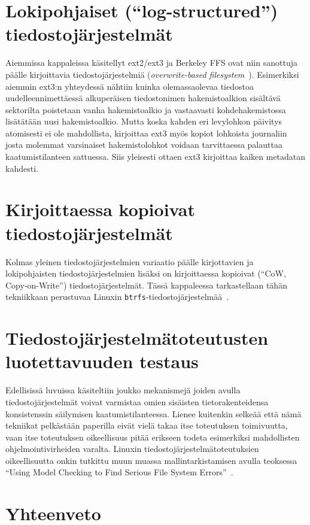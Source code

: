 \section{Lokipohjaiset (``log-structured'') tiedostojärjestelmät}
\label{ChapLogStructured}
Aiemmissa kappaleissa käsitellyt ext2/ext3 ja Berkeley FFS ovat niin sanottuja päälle kirjoittavia tiedostojärjestelmiä (\emph{overwrite-based filesystem}~\cite{Btrfs}).
Esimerkiksi aiemmin ext3:n yhteydessä nähtiin kuinka olemassaolevaa tiedostoa uudelleennimettäessä
alkuperäisen tiedostonimen hakemistoalkion sisältävä sektorilta poistetaan vanha hakemistoalkio
ja vastaavasti kohdehakemistossa lisätätään uusi hakemistoalkio.
Mutta koska kahden eri levylohkon päivitys atomisesti ei ole mahdollista,
kirjoittaa ext3 myös kopiot lohkoista journaliin josta molemmat varsinaiset hakemistolohkot voidaan tarvittaessa palauttaa kaatumistilanteen sattuessa.
Siis yleisesti ottaen ext3 kirjoittaa kaiken metadatan kahdesti.

\section{Kirjoittaessa kopioivat tiedostojärjestelmät}
\label{ChapCopyOnWrite}
Kolmas yleinen tiedostojärjestelmien variaatio päälle kirjottavien ja lokipohjaisten tiedostojärjestelmien lisäksi on kirjoittaessa kopioivat (``CoW, Copy-on-Write'') tiedostojärjestelmät.
Tässä kappaleessa tarkastellaan tähän tekniikkaan perustuvaa Linuxin \texttt{btrfs}-tiedostojärjestelmää~\cite{Btrfs}.

\section{Tiedostojärjestelmätoteutusten luotettavuuden testaus}

Edellisissä luvuissa käsiteltiin joukko mekanismejä joiden avulla tiedostojärjestelmät voivat varmistaa omien sisäisten tietorakenteidensa konsistenssin säilymisen kaatumistilanteessa.
Lienee kuitenkin selkeää että nämä tekniikat pelkästään paperilla eivät vielä takaa itse toteutuksen toimivuutta,
vaan itse toteutuksen oikeellisuus pitää erikseen todeta esimerkiksi mahdollisten ohjelmointivirheiden varalta.
Linuxin tiedostojärjestelmätoteutuksien oikeellisuutta onkin tutkittu muun muassa mallintarkistamisen avulla teoksessa ``Using Model Checking to Find Serious File System Errors''~\cite{ModelChecking}.

\section{Yhteenveto}
